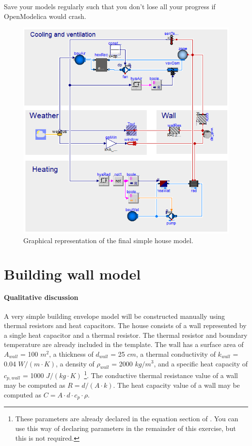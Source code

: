 \documentclass[10pt,a4paper]{article}
\begin{document}
Save your models regularly such that you don't lose all your progress if OpenModelica would crash.

\begin{figure}
\centering
\includegraphics[width=0.8\columnwidth]{img/simpleHouse.png}
\caption{Graphical representation of the final simple house model.}
\label{fig:simpleHouse}
\end{figure}


\newpage
\section{Building wall model}
\paragraph{Qualitative discussion}
A very simple building envelope model will be constructed manually using thermal resistors and heat capacitors. The house consists of a wall represented by a single heat capacitor and a thermal resistor. The thermal resistor and boundary temperature are already included in the template. The wall has a surface area of $A_{wall}$ = 100 $m^2$, a thickness of $d_{wall}$ = 25 $cm$, a thermal conductivity of $k_{wall}$ = 0.04 $W/(m \cdot K)$, a density of $\rho_{wall}$ = 2000 $kg/m^3$, and a specific heat capacity of $c_{p,wall}$ = 1000 $J/(kg \cdot K)$ \footnote{These parameters are already declared in the equation section of . You can use this way of declaring parameters in the remainder of this exercise, but this is not required.}. The conductive thermal resistance value of a wall may be computed as $R=d/(A\cdot k)$.
The heat capacity value of a wall may be computed as $C=A\cdot d \cdot c_p \cdot \rho$.
\end{document}
